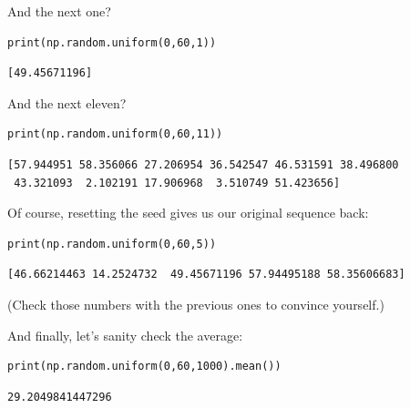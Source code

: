\medskip
And the next one?

\begin{Verbatim}[fontsize=\small,samepage=true,frame=single,framesep=3mm]
print(np.random.uniform(0,60,1))
\end{Verbatim}
\vspace{-.2in}

\begin{Verbatim}[fontsize=\small,samepage=true,frame=leftline,framesep=5mm,framerule=1mm]
[49.45671196]
\end{Verbatim}

\medskip
And the next eleven?

\begin{Verbatim}[fontsize=\small,samepage=true,frame=single,framesep=3mm]
print(np.random.uniform(0,60,11))
\end{Verbatim}
\vspace{-.2in}

\begin{Verbatim}[fontsize=\footnotesize,samepage=true,frame=leftline,framesep=5mm,framerule=1mm]
[57.944951 58.356066 27.206954 36.542547 46.531591 38.496800
 43.321093  2.102191 17.906968  3.510749 51.423656]
\end{Verbatim}

\medskip
Of course, resetting the seed gives us our original sequence back:

\begin{Verbatim}[fontsize=\small,samepage=true,frame=single,framesep=3mm]
print(np.random.uniform(0,60,5))
\end{Verbatim}
\vspace{-.2in}

\begin{Verbatim}[fontsize=\small,samepage=true,frame=leftline,framesep=5mm,framerule=1mm]
[46.66214463 14.2524732  49.45671196 57.94495188 58.35606683]
\end{Verbatim}

\medskip
(Check those numbers with the previous ones to convince yourself.)

\medskip
And finally, let's sanity check the average:

\begin{Verbatim}[fontsize=\small,samepage=true,frame=single,framesep=3mm]
print(np.random.uniform(0,60,1000).mean())                       
\end{Verbatim}
\vspace{-.2in}

\begin{Verbatim}[fontsize=\small,samepage=true,frame=leftline,framesep=5mm,framerule=1mm]
29.2049841447296
\end{Verbatim}

